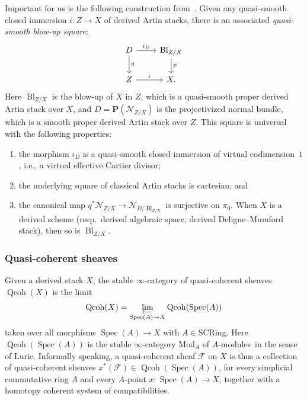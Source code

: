 \documentclass[11pt]{article}
\theoremstyle{definition}
\numberwithin{equation}{section}
\numberwithin{figure}{section}
\numberwithin{table}{section}
\newcommand{\sF}{\ensuremath{\mathcal{F}}\xspace}
\newcommand{\sN}{\ensuremath{\mathcal{N}}\xspace}
\newcommand{\bP}{\ensuremath{\mathbf{P}}\xspace}
\renewcommand{\lim}{\varprojlim}
\newcommand{\SCRing}{\mrm{SCRing}}
\newcommand{\Mod}{\mrm{Mod}}
\renewcommand{\P}{\bP}
\DeclareMathOperator{\Spec}{Spec}
\DeclareMathOperator{\Qcoh}{Qcoh}
\DeclareMathOperator{\Bl}{Bl}
\newcommand{\mrm}[1]{\ensuremath{\mathrm{#1}}\xspace}
\newcommand*{\alphenumi}{\renewcommand*{\theenumi}{\alph{enumi}}}
\begin{document}
Important for us is the following construction from~\cite{KhanBlowup}. Given any quasi-smooth closed immersion $i : Z \to X$ of derived Artin stacks, there is an associated \emph{quasi-smooth blow-up square}:
\begin{equation}\label{eq:qsbl square}
\begin{tikzcd}
D \ar{r}{i_D}\ar{d}{q} & \Bl_{Z/X} \ar{d}{p}
\\
Z \ar{r}{i} & X.
\end{tikzcd}
\end{equation}
Here $\Bl_{Z/X}$ is the blow-up of $X$ in $Z$, which is a quasi-smooth proper derived Artin stack over $X$, and $D = \P(\sN_{Z/X})$ is the projectivized normal bundle, which is a smooth proper derived Artin stack over $Z$. This square is universal with the following properties:
\begin{enumerate}\alphenumi
\item the morphism $i_D$ is a quasi-smooth closed immersion of virtual codimension~$1$, i.e., a virtual effective Cartier divisor;
\item the underlying square of classical Artin stacks is cartesian; and
\item the canonical map $q^*\sN_{Z/X} \to \sN_{D/\Bl_{Z/X}}$ is surjective on $\pi_0$. When $X$ is a derived scheme (resp.~derived algebraic space, derived Deligne--Mumford stack), then so is $\Bl_{Z/X}$.
\end{enumerate}

\subsubsection{Quasi-coherent sheaves}

Given a derived stack $X$, the stable $\infty$-category of quasi-coherent sheaves $\Qcoh(X)$ is the limit
\[
\Qcoh(X) = \lim_{\Spec(A) \to X} \Qcoh(\Spec(A))
\]
taken over all morphisms $\Spec(A) \to X$ with $A \in \SCRing$. Here $\Qcoh(\Spec(A))$ is the stable $\infty$-category $\Mod_A$ of $A$-modules\footnotemark~in the sense of Lurie.
 Informally speaking, a quasi-coherent sheaf $\sF$ on $X$ is thus a collection of quasi-coherent sheaves $x^*(\sF) \in \Qcoh(\Spec(A))$, for every simplicial commutative ring $A$ and every $A$-point $x : \Spec(A) \to X$, together with a homotopy coherent system of compatibilities.
\end{document}
